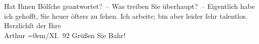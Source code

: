\begin{ledgroupsized}[t]{13cm}
           \pstart
           {\pb}Hat Ihnen Bölſche geantwortet? –\pend
           \pstart
           Was treiben Sie überhaupt? –\pend
           \pstart
           Eigentlich habe ich gehofft, Sie heuer öfters zu ſehen. Ich arbeite; bin aber
                    leider ſehr talentlos.\pend
           \pstart
           Herzlichſt der Ihre{\\[\baselineskip]}\spacefill\mbox{Arthur}\pend
           \leftskip=0em{}/XI. 92\pend
           \pstart
           Grüßen Sie Bahr!\pend
           
         
         \endnumbering{}\end{ledgroupsized}  \newcommand{\dateiname}{L00133}\newcommand{\titel}{Arthur Schnitzler an Hugo von Hofmannsthal, 9. 11. 1892}\newcommand{\editorInnen}{ Martin Anton Müller und Gerd-Hermann Susen}
      